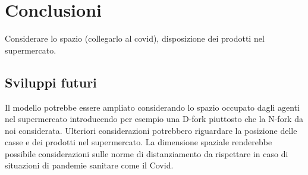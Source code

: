 \chapter{Conclusioni}

 Considerare lo spazio (collegarlo al
covid), disposizione dei prodotti nel supermercato.

\section{Sviluppi futuri}

Il modello potrebbe essere ampliato considerando lo spazio occupato
dagli agenti nel supermercato introducendo per esempio una D-fork
\cite{yanagisawa2011methods} piuttosto che la N-fork da noi
considerata. Ulteriori considerazioni potrebbero riguardare la
posizione delle casse e dei prodotti nel supermercato. La dimensione
spaziale renderebbe possibile considerazioni sulle norme di
distanziamento da rispettare in caso di situazioni di pandemie
sanitare come il Covid.
